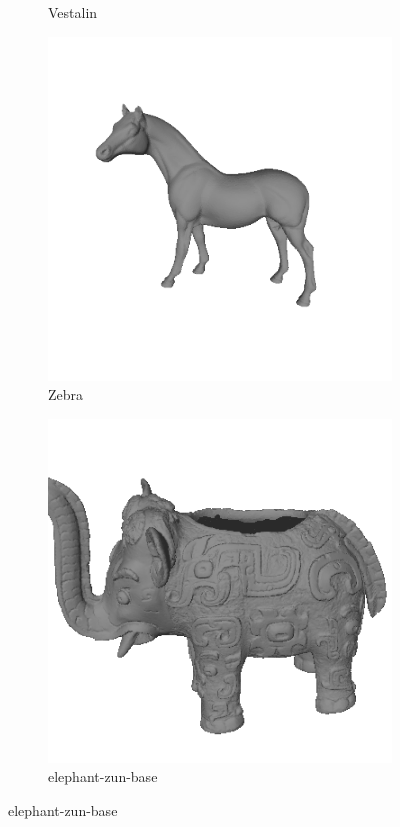 \begin{figure}
\begin{subfigure}[b]{0.23\linewidth}
		\caption{Vestalin}
	\end{subfigure}
	\begin{subfigure}[b]{0.23\linewidth}
		\includegraphics[width=\linewidth]{./Figures/train-dataset/42.zebra.png}
		\caption{Zebra}
	\end{subfigure}
	\begin{subfigure}[b]{0.23\linewidth}
		\includegraphics[width=\linewidth]{./Figures/train-dataset/43.elephant-zun-base.png}
		\caption{elephant-zun-base}
	\end{subfigure}


\end{figure}
